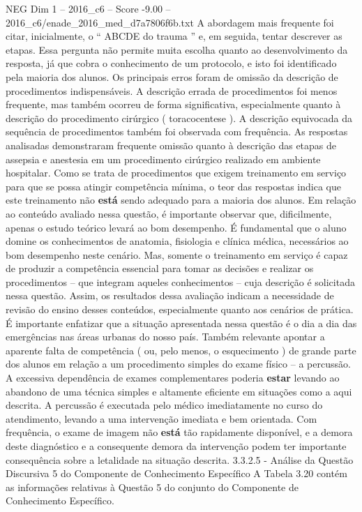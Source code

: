 \begin{textsample}{NEG Dim 1 – 2016\_c6 – Score -9.00 – 2016\_c6/enade\_2016\_med\_d7a7806f6b.txt}
A abordagem mais frequente foi citar, inicialmente, o “ ABCDE do trauma ” e, em seguida, tentar descrever as etapas.
Essa pergunta não permite muita escolha quanto ao desenvolvimento da resposta, já que cobra o conhecimento de um protocolo, e isto foi identificado pela maioria dos alunos.
Os principais erros foram de omissão da descrição de procedimentos indispensáveis.
A descrição errada de procedimentos foi menos frequente, mas também ocorreu de forma significativa, especialmente quanto à descrição do procedimento cirúrgico ( toracocentese ).
A descrição equivocada da sequência de procedimentos também foi observada com frequência.
As respostas analisadas demonstraram frequente omissão quanto à descrição das etapas de assepsia e anestesia em um procedimento cirúrgico realizado em ambiente hospitalar.
Como se trata de procedimentos que exigem treinamento em serviço para que se possa atingir competência mínima, o teor das respostas indica que este treinamento não \textbf{está} sendo adequado para a maioria dos alunos.
Em relação ao conteúdo avaliado nessa questão, é importante observar que, dificilmente, apenas o estudo teórico levará ao bom desempenho.
É fundamental que o aluno domine os conhecimentos de anatomia, fisiologia e clínica médica, necessários ao bom desempenho neste cenário.
Mas, somente o treinamento em serviço é capaz de produzir a competência essencial para tomar as decisões e realizar os procedimentos – que integram aqueles conhecimentos – cuja descrição é solicitada nessa questão.
Assim, os resultados dessa avaliação indicam a necessidade de revisão do ensino desses conteúdos, especialmente quanto aos cenários de prática.
É importante enfatizar que a situação apresentada nessa questão é o dia a dia das emergências nas áreas urbanas do nosso país.
Também relevante apontar a aparente falta de competência ( ou, pelo menos, o esquecimento ) de grande parte dos alunos em relação a um procedimento simples do exame físico – a percussão.
A excessiva dependência de exames complementares poderia \textbf{estar} levando ao abandono de uma técnica simples e altamente eficiente em situações como a aqui descrita.
A percussão é executada pelo médico imediatamente no curso do atendimento, levando a uma intervenção imediata e bem orientada.
Com frequência, o exame de imagem não \textbf{está} tão rapidamente disponível, e a demora deste diagnóstico e a consequente demora da intervenção podem ter importante consequência sobre a letalidade na situação descrita. 3.3.2.5 - Análise da Questão Discursiva 5 do Componente de Conhecimento Específico A Tabela 3.20 contém as informações relativas à Questão 5 do conjunto do Componente de Conhecimento Específico.

\end{textsample}
